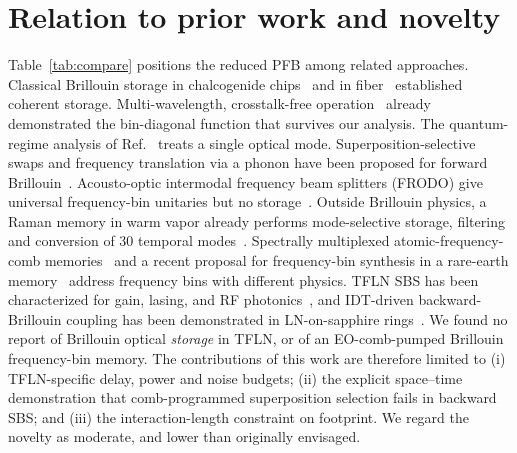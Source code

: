 \documentclass[reprint,amsmath,amssymb,aps,prapplied,superscriptaddress,floatfix]{revtex4-2}
\begin{document}
\section{Relation to prior work and novelty}\label{sec:prior}
Table~\ref{tab:compare} positions the reduced PFB among related approaches. Classical Brillouin storage in chalcogenide chips~\cite{Merklein2017,Stiller2020,Stiller2024} and in fiber~\cite{ZhuGauthierBoyd2007,Geilen2024,Saffer2025,Zeng2026} established coherent storage. Multi-wavelength, crosstalk-free operation~\cite{Stiller2019} already demonstrated the bin-diagonal function that survives our analysis. The quantum-regime analysis of Ref.~\cite{ZhuGenesStiller2026} treats a single optical mode. Superposition-selective swaps and frequency translation via a phonon have been proposed for forward Brillouin~\cite{ShepherdBehunin2025}. Acousto-optic intermodal frequency beam splitters (FRODO) give universal frequency-bin unitaries but no storage~\cite{Lukens2026FRODO}. Outside Brillouin physics, a Raman memory in warm vapor already performs mode-selective storage, filtering and conversion of 30 temporal modes~\cite{Zhang2026Raman}. Spectrally multiplexed atomic-frequency-comb memories~\cite{Sinclair2014} and a recent proposal for frequency-bin synthesis in a rare-earth memory~\cite{Moiseev2026} address frequency bins with different physics. TFLN SBS has been characterized for gain, lasing, and RF photonics~\cite{Ye2023SAW,Ye2025SciAdv,Rodrigues2025,Haerteis2025}, and IDT-driven backward-Brillouin coupling has been demonstrated in LN-on-sapphire rings~\cite{Xu2025LNOS,Zhu2025LNOS}. We found no report of Brillouin optical \emph{storage} in TFLN, or of an EO-comb-pumped Brillouin frequency-bin memory. The contributions of this work are therefore limited to (i) TFLN-specific delay, power and noise budgets; (ii) the explicit space--time demonstration that comb-programmed superposition selection fails in backward SBS; and (iii) the interaction-length constraint on footprint. We regard the novelty as moderate, and lower than originally envisaged.
\end{document}
